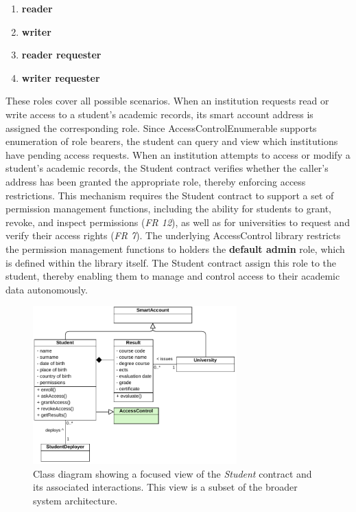 \begin{enumerate}
    \item \textbf{reader}
    \item \textbf{writer}
    \item \textbf{reader requester}
    \item \textbf{writer requester}
\end{enumerate}
These roles cover all possible scenarios. When an institution requests read or write access to a student's academic records,  its smart account address is assigned the corresponding role. Since AccessControlEnumerable supports enumeration of role bearers, the student can query and view which institutions have pending access requests. 
When an institution attempts to access or modify a student's academic records, the Student contract verifies whether the caller's address has been granted the appropriate role, thereby enforcing access restrictions. This mechanism requires the Student contract to support a set of permission management functions, including the ability for students to grant, revoke, and inspect permissions (\textit{FR 12}), as well as for universities to request and verify their access rights (\textit{FR 7}).
The underlying AccessControl library restricts the permission management functions to holders the \textbf{default admin} role, which is defined within the library itself. The Student contract assign this role to the student, thereby enabling them to manage and control access to their academic data autonomously. 
\begin{figure}
  \centering
  \includegraphics[width=0.7\textwidth]{figures/Student class diagram.pdf}
  \caption[Class diagram focused on \textit{Student} contract]{Class diagram showing a focused view of the \textit{Student} contract and its associated interactions. This view is a subset of the broader system architecture.}
  \label{fig:studentContractClass}
\end{figure}

